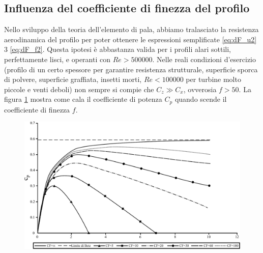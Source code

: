 \subsection{Influenza del coefficiente di finezza del profilo}
Nello sviluppo della teoria dell'elemento di pala, abbiamo tralasciato la resistenza aerodinamica del profilo per poter ottenere le espressioni semplificate \ref{eq:dF_u2} 3 \ref{eq:dF_f2}. Questa ipotesi è abbastanza valida per i profili alari sottili, perfettamente lisci, e operanti con $Re > 500000$. Nelle reali condizioni d'esercizio (profilo di un certo spessore per garantire resistenza strutturale, superficie sporca di polvere, superficie graffiata, insetti morti, $Re < 100000$ per turbine molto piccole e venti deboli) non sempre si compie che $C_z \gg C_x$, ovverosia $f > 50$. La figura \ref{fig:cplambda} mostra come cala il coefficiente di potenza $C_p$ quando scende il coefficiente di finezza $f$. 
\begin{figure}[h!]
\centering
  \includegraphics[width=.9\textwidth]{fig/cplambda.pdf}
\caption{}
\label{fig:cplambda}
\end{figure}

